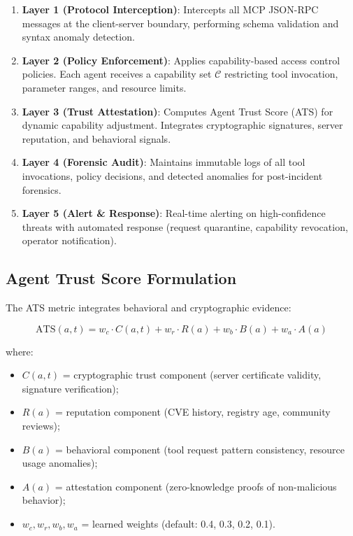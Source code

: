 \documentclass[12pt,twocolumn,journal]{IEEEtran}
\begin{document}
\begin{enumerate}
\item \textbf{Layer 1 (Protocol Interception)}: Intercepts all MCP JSON-RPC messages at the client-server boundary, performing schema validation and syntax anomaly detection.

\item \textbf{Layer 2 (Policy Enforcement)}: Applies capability-based access control policies. Each agent receives a capability set $\mathcal{C}$ restricting tool invocation, parameter ranges, and resource limits.

\item \textbf{Layer 3 (Trust Attestation)}: Computes Agent Trust Score (ATS) for dynamic capability adjustment. Integrates cryptographic signatures, server reputation, and behavioral signals.

\item \textbf{Layer 4 (Forensic Audit)}: Maintains immutable logs of all tool invocations, policy decisions, and detected anomalies for post-incident forensics.

\item \textbf{Layer 5 (Alert \& Response)}: Real-time alerting on high-confidence threats with automated response (request quarantine, capability revocation, operator notification).
\end{enumerate}

\subsection{Agent Trust Score Formulation}

The ATS metric integrates behavioral and cryptographic evidence:

\begin{equation}
\text{ATS}(a, t) = w_c \cdot C(a, t) + w_r \cdot R(a) + w_b \cdot B(a) + w_a \cdot A(a)
\label{eq:ats}
\end{equation}

where:
\begin{itemize}
\item $C(a, t)$ = cryptographic trust component (server certificate validity, signature verification);
\item $R(a)$ = reputation component (CVE history, registry age, community reviews);
\item $B(a)$ = behavioral component (tool request pattern consistency, resource usage anomalies);
\item $A(a)$ = attestation component (zero-knowledge proofs of non-malicious behavior);
\item $w_c, w_r, w_b, w_a$ = learned weights (default: 0.4, 0.3, 0.2, 0.1).
\end{itemize}
\end{document}
